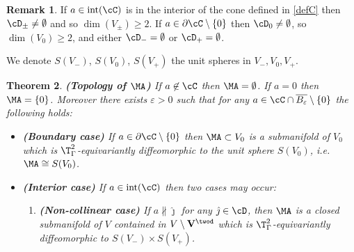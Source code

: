\documentclass[11pt,a4paper,reqno]{article}
\DeclareMathOperator{\interior}{int}
\numberwithin{equation}{section}
\newtheorem{theorem}{Theorem}[section]
\theoremstyle{definition}
\newtheorem{remark}[theorem]{Remark}
\begin{document}
\begin{remark}\label{lem:linese}
If $a\in \interior(\cC)$  is in the interior of
the  cone  defined   in \eqref{defC} 
  then  
  $\cD_\pm \not=\emptyset$ and so 
  $\dim(V_\pm ) \geq 2$.
%    
If 
$a \in \partial \cC\setminus\{0\} $ 
 then 
  $\cD_0 \not =\emptyset $, so  
$\dim(V_0)\geq 2 $, and   
either $\cD_- =\emptyset$ or $\cD_+ =\emptyset$.   
\end{remark}

We denote $S(V_-) $, $S(V_0) $, $S(V_+) $ the unit spheres 
in $ V_-, V_0, V_+  $.


\begin{theorem}\label{Topology of Sa}
{\bf (Topology of $\MA$)}
    If $a\not \in \cC$ 
    then $ \MA =\emptyset $.
    If $a=0$ then $\MA=\{0\}$. 
    Moreover there exists $\varepsilon>0$ such that for any $a\in \cC\cap \overline{B_\varepsilon} \setminus \{0\} $ the following holds:   
    \begin{itemize}
        \item[$(\beth)$] {\bf (Boundary case)} If $a\in \partial \cC\setminus\{0\}$ then   
        $ \MA \subset  V_0 $ is a submanifold of $ V_0 $ which is $\T^2_{\Gamma}$-equivariantly diffeomorphic to the unit sphere 
        $ S(V_0) $, i.e. 
        $   \MA \cong S(V_0) $.

        \item[$(\daleth)$] {\bf (Interior case)} If $a\in \interior(\cC)$  then  two cases may occur:
        \begin{enumerate}
            \item[$(\daleth$1)] {\bf (Non-collinear case)} If $a 
            \not \parallel \hat \jmath $  for any $ \hat \jmath \in \cD $,  then  $\MA$ is a closed submanifold of $V$  contained in $V\setminus 
            {\bf V}^{\twod} $ which is 
            $\T^2_{\Gamma}$-equivariantly diffeomorphic to   $ S(V_-)\times S(V_+) $. 
        

\end{enumerate}
\end{itemize}
\end{theorem}
\end{document}
